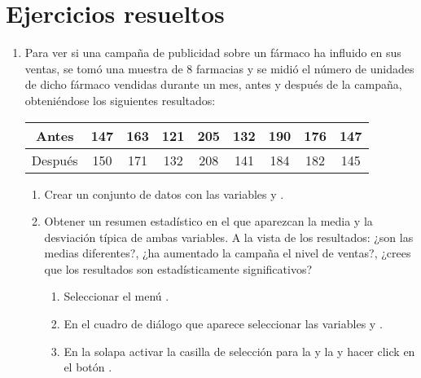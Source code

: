 \section{Ejercicios resueltos}
\begin{enumerate}[leftmargin=*] 
\item  Para ver si una campaña de publicidad sobre un fármaco ha influido en sus ventas, se tomó una muestra de 8 farmacias y se midió el
número de unidades de dicho fármaco vendidas durante un mes, antes y después de la campaña, obteniéndose los siguientes resultados: 
\begin{center}
\begin{tabular}{|c||c|c|c|c|c|c|c|c|}
\hline 
Antes & 147 & 163 & 121 & 205 & 132 & 190 & 176 & 147 \\
\hline 
Después & 150 & 171 & 132 & 208 & 141 & 184 & 182 & 145\\ 
\hline
\end{tabular}
\end{center}

\begin{enumerate}
\item Crear un conjunto de datos con las variables  y .

\item Obtener un resumen estadístico en el que aparezcan la media y la desviación típica de ambas variables. A la vista
de los resultados: ¿son las medias diferentes?, ¿ha aumentado la campaña el nivel de ventas?, ¿crees que los resultados
son estadísticamente significativos? 
\begin{indicacion}
\begin{enumerate}
\item Seleccionar el menú .
\item En el cuadro de diálogo que aparece seleccionar las variables  y .
\item En la solapa  activar la casilla de selección
para la  y la  y hacer click en el botón .
\end{enumerate}
\end{indicacion}


\end{enumerate}
\end{enumerate}
